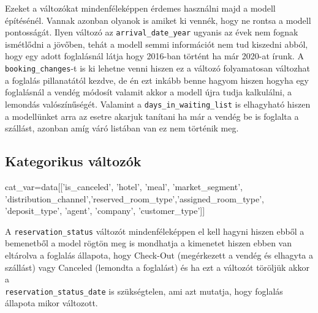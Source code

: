 Ezeket a változókat mindenféleképpen érdemes használni majd a modell építésénél. Vannak azonban olyanok is amiket ki vennék, hogy ne rontsa a modell pontosságát. Ilyen változó az \texttt{arrival\_date\_year} ugyanis az évek nem fognak ismétlődni a jövőben, tehát a modell semmi információt nem tud kiszedni abból, hogy egy adott foglalásnál látja hogy 2016-ban történt ha már 2020-at írunk. A \texttt{booking\_changes}-t is ki lehetne venni hiszen ez a változó folyamatosan változhat a foglalás pillanatától kezdve, de én ezt inkább benne hagyom hiszen hogyha egy foglalásnál a vendég módosít valamit akkor a modell újra tudja kalkulálni, a lemondás valószínűségét. Valamint a \texttt{days\_in\_waiting\_list} is elhagyható hiszen a modellünket arra az esetre akarjuk tanítani ha már a vendég be is foglalta a szállást, azonban amíg váró listában van ez nem történik meg.

\subsection{Kategorikus változók}

\begin{python}
cat_var=data[['is_canceled', 'hotel', 'meal', 'market_segment',
       'distribution_channel','reserved_room_type','assigned_room_type',
       'deposit_type', 'agent', 'company', 'customer_type']]
\end{python}


A \texttt{reservation\_status} változót mindenféleképpen el kell hagyni hiszen ebből a bemenetből a model rögtön meg is mondhatja a kimenetet hiszen ebben van eltárolva a foglalás állapota, hogy Check-Out (megérkezett a vendég és elhagyta a szállást) vagy Canceled (lemondta a foglalást) és ha ezt a változót töröljük akkor a \\
\texttt{reservation\_status\_date} is szükségtelen, ami azt mutatja, hogy foglalás állapota mikor változott.

